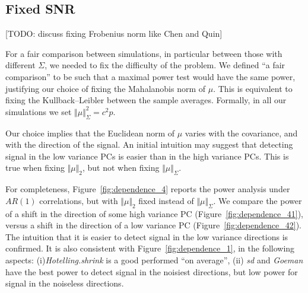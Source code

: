 \documentclass[journal]{IEEEtran}
\begin{document}
\subsection{Fixed SNR}
\label{sec:fix_snr}

[TODO: discuss fixing Frobenius norm like Chen and Quin]

For a fair comparison between simulations, in particular between those with different $\Sigma$, we needed to fix the difficulty of the problem.
We defined ``a fair comparison'' to be such that a maximal power test would have the same power, justifying our choice of fixing the Mahalanobis norm of $\mu$. 
This is equivalent to fixing the Kullback–Leibler between the sample averages. 
Formally, in all our simulations we set $\Vert \mu \Vert_\Sigma^2=c^2 p$.

Our choice implies that the Euclidean norm of $\mu$ varies with the covariance, and with the direction of the signal.
An initial intuition may suggest that detecting signal in the low variance PCs is easier than in the high variance PCs. 
This is true when fixing $\Vert \mu \Vert_2$, but not when fixing $\Vert \mu \Vert_\Sigma$.

For completeness, Figure~\ref{fig:dependence_4} reports the power analysis under $AR(1)$ correlations, but with $\Vert \mu \Vert_2$ fixed instead of $\Vert \mu \Vert_\Sigma$.
We compare the power of a shift in the direction of some high variance PC (Figure~\ref{fig:dependence_41}), versus a shift in the direction of a low variance PC (Figure~\ref{fig:dependence_42}).
The intuition that it is easier to detect signal in the low variance directions is confirmed. 
It is also consistent with Figure~\ref{fig:dependence_1}, in the following aspects: 
(i)\emph{Hotelling.shrink} is a good performed ``on average'', 
(ii) \emph{sd} and \emph{Goeman} have the best power to detect signal in the noisiest directions, but low power for signal in the noiseless directions. 
\end{document}
